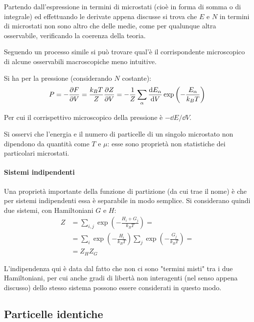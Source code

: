 Partendo dall'espressione in termini di microstati (cioè in forma di somma o di integrale) ed effettuando le derivate appena discusse si trova che $E$ e $N$ in termini di microstati non sono altro che delle medie, come per qualunque altra osservabile, verificando la coerenza della teoria.

Seguendo un processo simile si può trovare qual'è il corrispondente microscopico di alcune osservabili macroscopiche meno intuitive.

\begin{es}
	\label{es:micropress}
	Si ha per la pressione (considerando $N$ costante):
	\begin{equation*}
	P = - \partdev{F}{V} = \frac{k_B T}{Z} \partdev{Z}{V} = - \frac{1}{Z} \sum_{\alpha} \derivative{E_\alpha}{V} \exp \left(- \frac{E_\alpha}{k_B T}\right)
	\end{equation*}
	
	Per cui il corrispettivo microscopico della pressione è $-\dd E /\dd V$.
\end{es}

\noindent Si osservi che l'energia e il numero di particelle di un singolo microstato non dipendono da quantità come $T$ e $\mu$: esse sono proprietà non statistiche dei particolari microstati.

\paragraph{Sistemi indipendenti} Una proprietà importante della funzione di partizione (da cui trae il nome) è che per sistemi indipendenti essa è separabile in modo semplice. Si considerano quindi due sistemi, con Hamiltoniani $G$ e $H$:
\begin{align*}
Z &= \sum_{i,j} \exp \left( - \frac{H_i + G_j}{k_B T} \right) =\\
&= \sum_{i} \exp \left( - \frac{H_i}{k_B T} \right) \sum_{j} \exp \left( - \frac{G_j}{k_B T} \right) =\\
&= Z_H Z_G
\end{align*}

L'indipendenza qui è data dal fatto che non ci sono "termini misti" tra i due Hamiltoniani, per cui anche gradi di libertà non interagenti (nel senso appena discusso) dello stesso sistema possono essere considerati in questo modo.

\subsection{Particelle identiche}
\label{sec:idpart}

